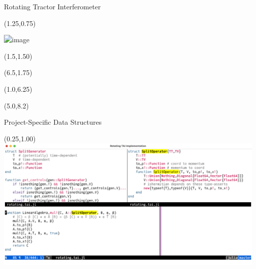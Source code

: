 \documentclass[compress, aspectratio=169,usepdftitle=false]{beamer}
\begin{document}
\begin{frame}{Rotating Tractor Interferometer}
  \begin{textblock}{13.5}(1.25,0.75)
    \begin{center}
      \includegraphics<2>{images/pinwheel}
    \end{center}
  \end{textblock}
  \begin{textblock}{15.5}(1.5,1.50)
  \end{textblock}
  \begin{textblock}{8.0}(6.5,1.75)
  \end{textblock}
  \begin{textblock}{14.0}(1.0,6.25)
  \end{textblock}
  \begin{textblock}{10}(5.0,8.2)
  \end{textblock}
\end{frame}


\begin{frame}{Project-Specific Data Structures}
  \begin{textblock}{15.5}(0.25,1.00)
    \includegraphics[width=\textwidth]{images/rottai_code}
  \end{textblock}
\end{frame}
\end{document}

